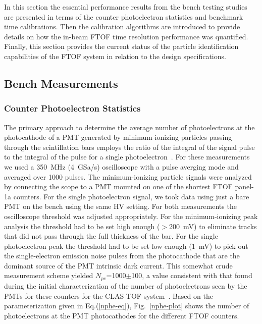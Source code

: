 \documentclass[3p,times,twocolumn]{elsarticle}
\begin{document}
In this section the essential performance results from the bench testing studies are presented in terms
of the counter photoelectron statistics and benchmark time calibrations. Then the calibration algorithms
are introduced to provide details on how the in-beam FTOF time resolution performance was quantified.
Finally, this section provides the current status of the particle identification capabilities of the FTOF
system in relation to the design specifications.

\subsection{Bench Measurements}

\subsubsection{Counter Photoelectron Statistics}
\label{sec:npe}

The primary approach to determine the average number of photoelectrons at the photocathode of a PMT
generated by minimum-ionizing particles passing through the scintillation bars employs the ratio of the
integral of the signal pulse to the integral of the pulse for a single photoelectron~\cite{Gi86}. For these
measurements we used a 350~MHz (4~GSa/s) oscilloscope with a pulse averging mode and averaged over
1000 pulses. The minimum-ionizing particle signals were analyzed by connecting the scope to a PMT mounted
on one of the shortest FTOF panel-1a counters. For the single photoelectron signal, we took data using just a
bare PMT on the bench using the same HV setting. For both measurements the oscilloscope threshold was
adjusted appropriately. For the minimum-ionizing peak analysis the threshold had to be set high enough
($>$200~mV) to eliminate tracks that did not pass through the full thickness of the bar. For the single
photoelectron peak the threshold had to be set low enough (1~mV) to pick out the single-electron emission
noise pulses from the photocathode that are the dominant source of the PMT intrinsic dark current. This
somewhat crude measurement scheme yielded $N_{pe}$=1000$\pm$100, a value consistent with that found
during the initial characterization of the number of photoelectrons seen by the PMTs for these counters for
the CLAS TOF system~\cite{tof-nim}. Based on the parameterization given in Eq.(\ref{nphe-eq}),
Fig.~\ref{nphe-plot} shows the number of photoelectrons at the PMT photocathodes for the different FTOF
counters.
\end{document}
